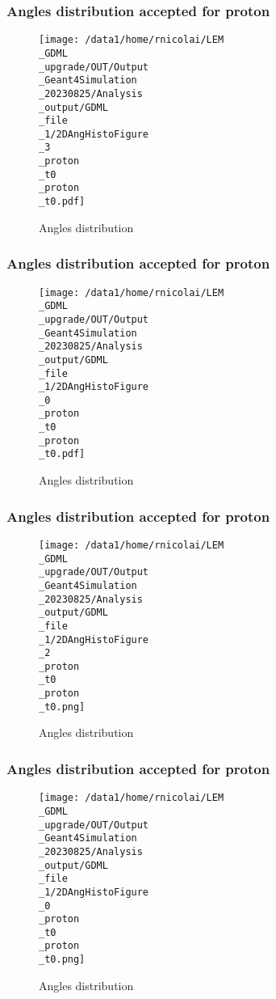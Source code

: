 \documentclass[8pt]{beamer}
\begin{document}
            \begin{frame}
                \frametitle{Angles distribution accepted for proton}
            
        \begin{figure}[h]
            \centering
            \texttt{[image: /data1/home/rnicolai/LEM\\\_GDML\\\_upgrade/OUT/Output\\\_Geant4Simulation\\\_20230825/Analysis\\\_output/GDML\\\_file\\\_1/2DAngHistoFigure\\\_3\\\_proton\\\_t0\\\_proton\\\_t0.pdf]}
            \caption{Angles distribution}
        \end{figure}
        
            \end{frame}
            
            \begin{frame}
                \frametitle{Angles distribution accepted for proton}
            
        \begin{figure}[h]
            \centering
            \texttt{[image: /data1/home/rnicolai/LEM\\\_GDML\\\_upgrade/OUT/Output\\\_Geant4Simulation\\\_20230825/Analysis\\\_output/GDML\\\_file\\\_1/2DAngHistoFigure\\\_0\\\_proton\\\_t0\\\_proton\\\_t0.pdf]}
            \caption{Angles distribution}
        \end{figure}
        
            \end{frame}
            
            \begin{frame}
                \frametitle{Angles distribution accepted for proton}
            
        \begin{figure}[h]
            \centering
            \texttt{[image: /data1/home/rnicolai/LEM\\\_GDML\\\_upgrade/OUT/Output\\\_Geant4Simulation\\\_20230825/Analysis\\\_output/GDML\\\_file\\\_1/2DAngHistoFigure\\\_2\\\_proton\\\_t0\\\_proton\\\_t0.png]}
            \caption{Angles distribution}
        \end{figure}
        
            \end{frame}
            
            \begin{frame}
                \frametitle{Angles distribution accepted for proton}
            
        \begin{figure}[h]
            \centering
            \texttt{[image: /data1/home/rnicolai/LEM\\\_GDML\\\_upgrade/OUT/Output\\\_Geant4Simulation\\\_20230825/Analysis\\\_output/GDML\\\_file\\\_1/2DAngHistoFigure\\\_0\\\_proton\\\_t0\\\_proton\\\_t0.png]}
            \caption{Angles distribution}
        \end{figure}
        
            \end{frame}
            
\end{document}
